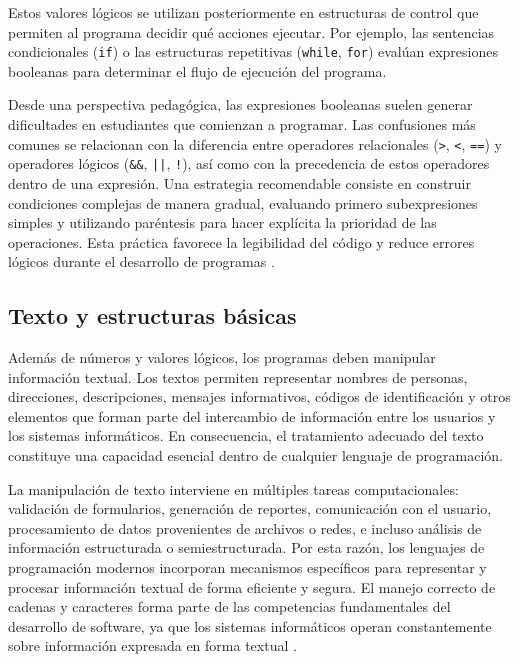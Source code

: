 \documentclass[12pt,twoside]{book}
\begin{document}
						\noindent
						Estos valores lógicos se utilizan posteriormente en estructuras de control que permiten al programa decidir qué acciones ejecutar. Por ejemplo, las sentencias condicionales (\texttt{if}) o las estructuras repetitivas (\texttt{while}, \texttt{for}) evalúan expresiones booleanas para determinar el flujo de ejecución del programa.
						
						Desde una perspectiva pedagógica, las expresiones booleanas suelen generar dificultades en estudiantes que comienzan a programar. Las confusiones más comunes se relacionan con la diferencia entre operadores relacionales (\texttt{>}, \texttt{<}, \texttt{==}) y operadores lógicos (\texttt{\&\&}, \texttt{||}, \texttt{!}), así como con la precedencia de estos operadores dentro de una expresión. Una estrategia recomendable consiste en construir condiciones complejas de manera gradual, evaluando primero subexpresiones simples y utilizando paréntesis para hacer explícita la prioridad de las operaciones. Esta práctica favorece la legibilidad del código y reduce errores lógicos durante el desarrollo de programas \cite{Qian2018Students,Deitel2025Java}.

				\subsection{Texto y estructuras básicas}
					Además de números y valores lógicos, los programas deben manipular información textual. Los textos permiten representar nombres de personas, direcciones, descripciones, mensajes informativos, códigos de identificación y otros elementos que forman parte del intercambio de información entre los usuarios y los sistemas informáticos. En consecuencia, el tratamiento adecuado del texto constituye una capacidad esencial dentro de cualquier lenguaje de programación.
						
					La manipulación de texto interviene en múltiples tareas computacionales: validación de formularios, generación de reportes, comunicación con el usuario, procesamiento de datos provenientes de archivos o redes, e incluso análisis de información estructurada o semiestructurada. Por esta razón, los lenguajes de programación modernos incorporan mecanismos específicos para representar y procesar información textual de forma eficiente y segura. El manejo correcto de cadenas y caracteres forma parte de las competencias fundamentales del desarrollo de software, ya que los sistemas informáticos operan constantemente sobre información expresada en forma textual \cite{Sommerville2015Software,Deitel2025Java}.
					
\end{document}
